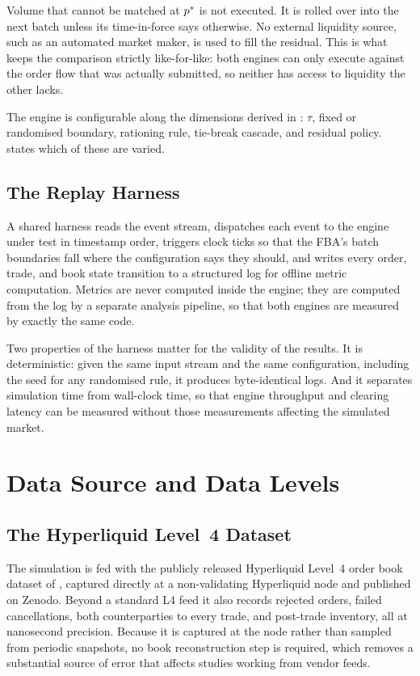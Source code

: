 Volume that cannot be matched at $p^{\ast}$ is not executed. It is rolled
over into the next batch unless its time-in-force says otherwise. No
external liquidity source, such as an automated market maker, is used to
fill the residual. This is what keeps the comparison strictly
like-for-like: both engines can only execute against the order flow that
was actually submitted, so neither has access to liquidity the other
lacks.

The engine is configurable along the dimensions derived in
: $\tau$, fixed or randomised boundary, rationing rule,
tie-break cascade, and residual policy.  states
which of these are varied.

\subsection{The Replay Harness}

A shared harness reads the event stream, dispatches each event to the
engine under test in timestamp order, triggers clock ticks so that the
FBA's batch boundaries fall where the configuration says they should,
and writes every order, trade, and book state transition to a structured
log for offline metric computation. Metrics are never computed inside
the engine; they are computed from the log by a separate analysis
pipeline, so that both engines are measured by exactly the same code.

Two properties of the harness matter for the validity of the results.
It is deterministic: given the same input stream and the same
configuration, including the seed for any randomised rule, it produces
byte-identical logs. And it separates simulation time from wall-clock
time, so that engine throughput and clearing latency can be measured
without those measurements affecting the simulated market.

\section{Data Source and Data Levels}
\label{sec:data}

\subsection{The Hyperliquid Level~4 Dataset}

The simulation is fed with the publicly released Hyperliquid Level~4
order book dataset of \citet{albers2026openbook}, captured directly at a
non-validating Hyperliquid node and published on Zenodo. Beyond a
standard L4 feed it also records rejected orders, failed cancellations,
both counterparties to every trade, and post-trade inventory, all at
nanosecond precision. Because it is captured at the node rather than
sampled from periodic snapshots, no book reconstruction step is
required, which removes a substantial source of error that affects
studies working from vendor feeds.

